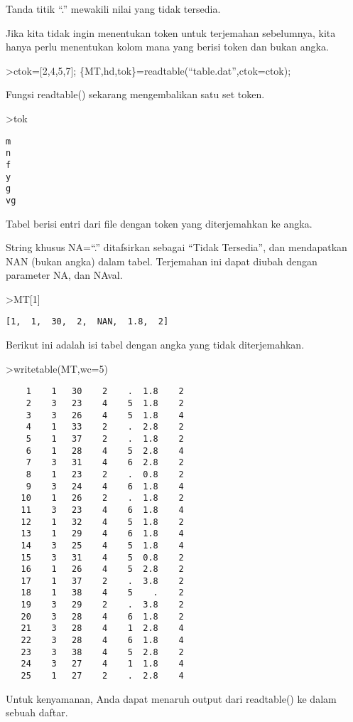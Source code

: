 \documentclass[
]{book}
\begin{document}
Tanda titik ``.'' mewakili nilai yang tidak tersedia.

Jika kita tidak ingin menentukan token untuk terjemahan sebelumnya, kita hanya perlu menentukan kolom mana yang berisi token dan bukan angka.

\textgreater ctok={[}2,4,5,7{]}; \{MT,hd,tok\}=readtable(``table.dat'',ctok=ctok);

Fungsi readtable() sekarang mengembalikan satu set token.

\textgreater tok

\begin{verbatim}
m
n
f
y
g
vg
\end{verbatim}

Tabel berisi entri dari file dengan token yang diterjemahkan ke angka.

String khusus NA=``.'' ditafsirkan sebagai ``Tidak Tersedia'', dan mendapatkan NAN (bukan angka) dalam tabel. Terjemahan ini dapat diubah dengan parameter NA, dan NAval.

\textgreater MT{[}1{]}

\begin{verbatim}
[1,  1,  30,  2,  NAN,  1.8,  2]
\end{verbatim}

Berikut ini adalah isi tabel dengan angka yang tidak diterjemahkan.

\textgreater writetable(MT,wc=5)

\begin{verbatim}
    1    1   30    2    .  1.8    2
    2    3   23    4    5  1.8    2
    3    3   26    4    5  1.8    4
    4    1   33    2    .  2.8    2
    5    1   37    2    .  1.8    2
    6    1   28    4    5  2.8    4
    7    3   31    4    6  2.8    2
    8    1   23    2    .  0.8    2
    9    3   24    4    6  1.8    4
   10    1   26    2    .  1.8    2
   11    3   23    4    6  1.8    4
   12    1   32    4    5  1.8    2
   13    1   29    4    6  1.8    4
   14    3   25    4    5  1.8    4
   15    3   31    4    5  0.8    2
   16    1   26    4    5  2.8    2
   17    1   37    2    .  3.8    2
   18    1   38    4    5    .    2
   19    3   29    2    .  3.8    2
   20    3   28    4    6  1.8    2
   21    3   28    4    1  2.8    4
   22    3   28    4    6  1.8    4
   23    3   38    4    5  2.8    2
   24    3   27    4    1  1.8    4
   25    1   27    2    .  2.8    4
\end{verbatim}

Untuk kenyamanan, Anda dapat menaruh output dari readtable() ke dalam sebuah daftar.
\end{document}
